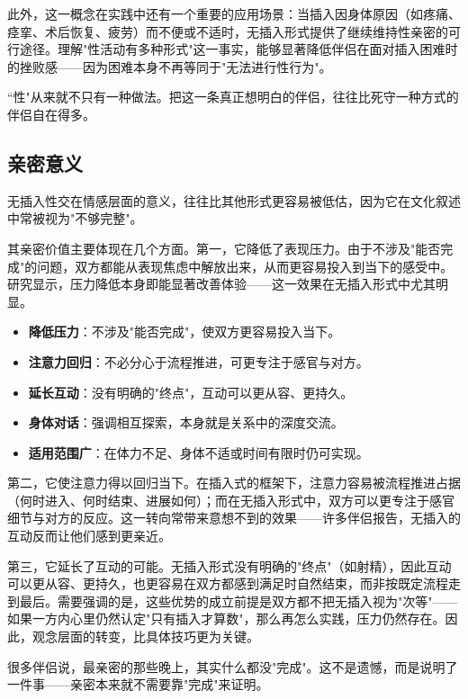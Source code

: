 \documentclass[12pt,UTF8]{ctexbook}
\newcommand{\keyword}[1]{\textbf{#1}}
\begin{document}
此外，这一概念在实践中还有一个重要的应用场景：当插入因身体原因（如疼痛、痉挛、术后恢复、疲劳）而不便或不适时，无插入形式提供了继续维持性亲密的可行途径。理解"性活动有多种形式"这一事实，能够显著降低伴侣在面对插入困难时的挫败感——因为困难本身不再等同于"无法进行性行为"。

\begin{tcolorbox}[colback=pink!5!white,colframe=red!50!black,title=贴心小叮咛]
	“性"从来就不只有一种做法。把这一条真正想明白的伴侣，往往比死守一种方式的伴侣自在得多。
\end{tcolorbox}
\subsection{亲密意义}

无插入性交在情感层面的意义，往往比其他形式更容易被低估，因为它在文化叙述中常被视为"不够完整"。

其亲密价值主要体现在几个方面。第一，它降低了表现压力。由于不涉及"能否完成"的问题，双方都能从表现焦虑中解放出来，从而更容易投入到当下的感受中。研究显示，压力降低本身即能显著改善体验——这一效果在无插入形式中尤其明显。

\begin{itemize}
	\item \keyword{降低压力}：不涉及"能否完成"，使双方更容易投入当下。
	\item \keyword{注意力回归}：不必分心于流程推进，可更专注于感官与对方。
	\item \keyword{延长互动}：没有明确的"终点"，互动可以更从容、更持久。
	\item \keyword{身体对话}：强调相互探索，本身就是关系中的深度交流。
	\item \keyword{适用范围广}：在体力不足、身体不适或时间有限时仍可实现。
\end{itemize}

第二，它使注意力得以回归当下。在插入式的框架下，注意力容易被流程推进占据（何时进入、何时结束、进展如何）；而在无插入形式中，双方可以更专注于感官细节与对方的反应。这一转向常带来意想不到的效果——许多伴侣报告，无插入的互动反而让他们感到更亲近。

第三，它延长了互动的可能。无插入形式没有明确的"终点"（如射精），因此互动可以更从容、更持久，也更容易在双方都感到满足时自然结束，而非按既定流程走到最后。需要强调的是，这些优势的成立前提是双方都不把无插入视为"次等"——如果一方内心里仍然认定"只有插入才算数"，那么再怎么实践，压力仍然存在。因此，观念层面的转变，比具体技巧更为关键。

\begin{tcolorbox}[colback=pink!5!white,colframe=red!50!black,title=贴心小叮咛]
	很多伴侣说，最亲密的那些晚上，其实什么都没"完成"。这不是遗憾，而是说明了一件事——亲密本来就不需要靠"完成"来证明。
\end{tcolorbox}
\end{document}
